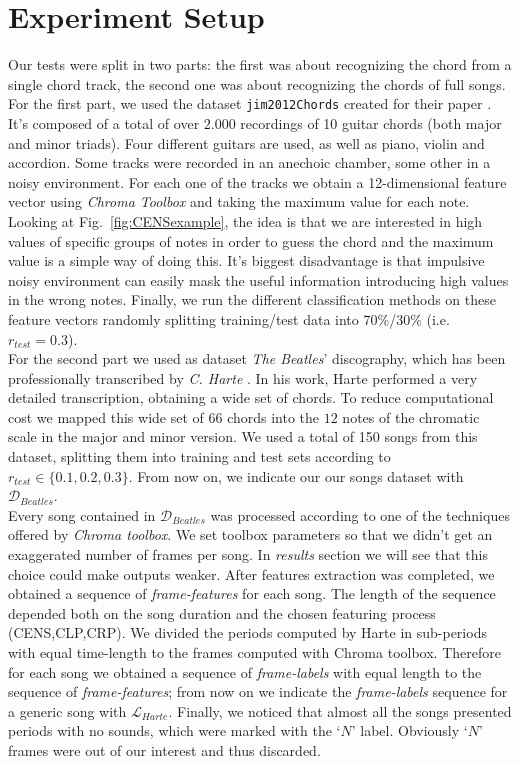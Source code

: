 \section{Experiment Setup}
\label{sec:setup}

Our tests were split in two parts: the first was about recognizing the chord from a single chord track, the second one was about recognizing the chords of full songs.\\
%
For the first part, we used the dataset \texttt{jim2012Chords} \cite{jim2012Chords} created for their paper \cite{JimChordsPaper}. It's composed of a total of over $2.000$ recordings of 10 guitar chords (both major and minor triads). Four different guitars are used, as well as piano, violin and accordion. Some tracks were recorded in an anechoic chamber, some other in a noisy environment. For each one of the tracks we obtain a 12-dimensional feature vector using \textit{Chroma Toolbox} and taking the maximum value for each note. Looking at Fig.~\ref{fig:CENSexample}, the idea is that we are interested in high values of specific groups of notes in order to guess the chord and the maximum value is a simple way of doing this. It's biggest disadvantage is that impulsive noisy environment can easily mask the useful information introducing high values in the wrong notes. Finally, we run the different classification methods on these feature vectors randomly splitting training/test data into 70\%/30\% (i.e. $r_{test}=0.3$).\\
%
For the second part we used as dataset \textit{The Beatles}' discography, which has been professionally transcribed by \textit{C. Harte} \cite{HartePaper}\cite{HarteThesis}. In his work, Harte performed a very detailed transcription, obtaining a wide set of chords. To reduce computational cost we mapped this wide set of $66$ chords into the $12$ notes of the chromatic scale in the major and minor version. We used a total of 150 songs from this dataset, splitting them into training and test sets according to $r_{test}\in \{0.1,0.2,0.3\}$. From now on, we indicate our our songs dataset with $\mathcal{D}_{Beatles}$. \\
%
Every song contained in $\mathcal{D}_{Beatles}$ was processed according to one of the techniques offered by \textit{Chroma toolbox}. We set toolbox parameters so that we didn't get an exaggerated number of frames per song. In \textit{results} section we will see that this choice could make outputs weaker. After features extraction was completed, we obtained a sequence of \textit{frame-features} for each song. The length of the sequence depended both on the song duration and the chosen featuring process (CENS,CLP,CRP). We divided the periods computed by Harte in sub-periods with equal time-length to the frames computed with Chroma toolbox. Therefore for each song we obtained a sequence of \textit{frame-labels} with equal length to the sequence of \textit{frame-features}; from now on we indicate the \textit{frame-labels} sequence for a generic song with $\mathcal{L}_{Harte}$. Finally, we noticed that almost all the songs presented periods with no sounds, which were marked with the `$N$' label. Obviously `$N$' frames were out of our interest and thus discarded. \\
